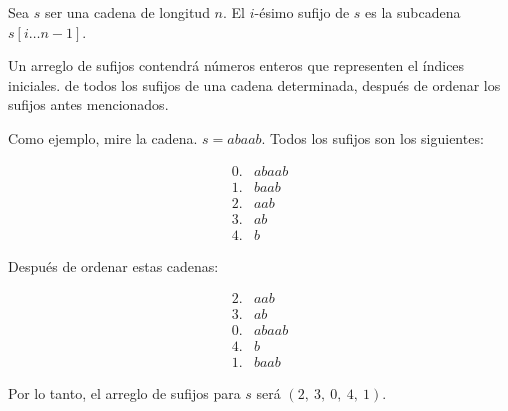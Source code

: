 Sea $s$ ser una cadena de longitud $n$. El $i$-ésimo sufijo de $s$ es la subcadena $s[i \ldots n-1]$.

Un arreglo de sufijos contendrá números enteros que representen el índices iniciales. de todos los sufijos de una cadena determinada, después de ordenar los sufijos antes mencionados.

Como ejemplo, mire la cadena. $s=abaab$. Todos los sufijos son los siguientes:

$$\begin{array}{ll} 0. & abaab \\ 1. & baab \\ 2. & aab \\ 3. & ab \\ 4. & b \end{array}$$

Después de ordenar estas cadenas:

$$\begin{array}{ll} 2. & aab \\ 3. & ab \\ 0. & abaab \\ 4. & b \\ 1. & baab \end{array}$$

Por lo tanto, el arreglo de sufijos para $s$ será $(2,~3,~0,~4,~1)$.